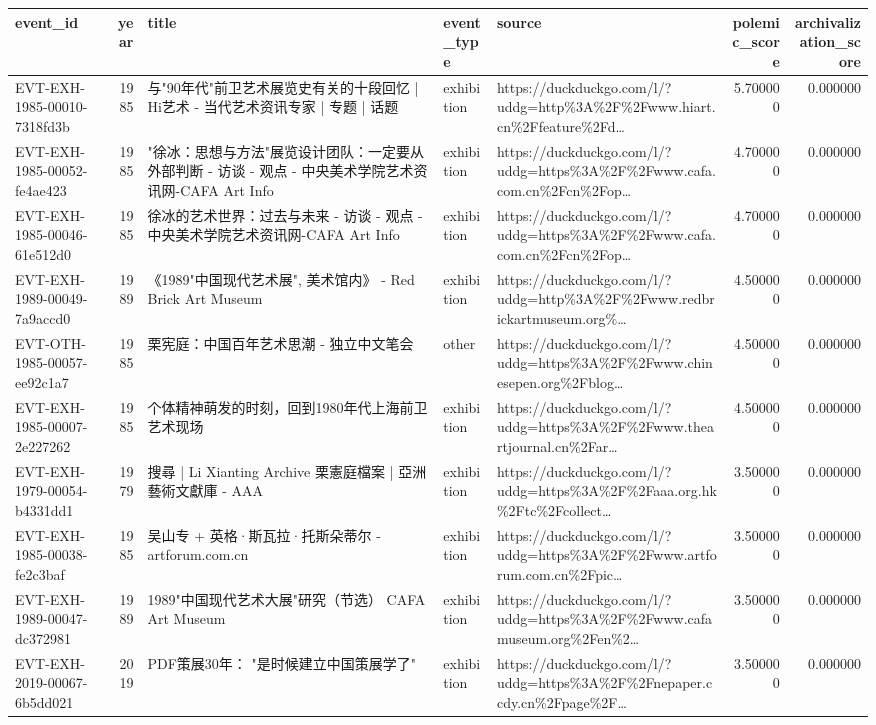 \begin{tabular}{lrlllrr}
\toprule
event\_id & year & title & event\_type & source & polemic\_score & archivalization\_score \\
\midrule
EVT-EXH-1985-00010-7318fd3b & 1985 & 与"90年代"前卫艺术展览史有关的十段回忆 | Hi艺术 - 当代艺术资讯专家 | 专题 | 话题 & exhibition & https://duckduckgo.com/l/?uddg=http\%3A\%2F\%2Fwww.hiart.cn\%2Ffeature\%2Fd… & 5.700000 & 0.000000 \\
EVT-EXH-1985-00052-fe4ae423 & 1985 & "徐冰：思想与方法"展览设计团队：一定要从外部判断 - 访谈 - 观点 - 中央美术学院艺术资讯网-CAFA Art Info & exhibition & https://duckduckgo.com/l/?uddg=https\%3A\%2F\%2Fwww.cafa.com.cn\%2Fcn\%2Fop… & 4.700000 & 0.000000 \\
EVT-EXH-1985-00046-61e512d0 & 1985 & 徐冰的艺术世界：过去与未来 - 访谈 - 观点 - 中央美术学院艺术资讯网-CAFA Art Info & exhibition & https://duckduckgo.com/l/?uddg=https\%3A\%2F\%2Fwww.cafa.com.cn\%2Fcn\%2Fop… & 4.700000 & 0.000000 \\
EVT-EXH-1989-00049-7a9accd0 & 1989 & 《1989"中国现代艺术展", 美术馆内》 - Red Brick Art Museum & exhibition & https://duckduckgo.com/l/?uddg=http\%3A\%2F\%2Fwww.redbrickartmuseum.org\%… & 4.500000 & 0.000000 \\
EVT-OTH-1985-00057-ee92c1a7 & 1985 & 栗宪庭：中国百年艺术思潮 - 独立中文笔会 & other & https://duckduckgo.com/l/?uddg=https\%3A\%2F\%2Fwww.chinesepen.org\%2Fblog… & 4.500000 & 0.000000 \\
EVT-EXH-1985-00007-2e227262 & 1985 & 个体精神萌发的时刻，回到1980年代上海前卫艺术现场 & exhibition & https://duckduckgo.com/l/?uddg=https\%3A\%2F\%2Fwww.theartjournal.cn\%2Far… & 4.500000 & 0.000000 \\
EVT-EXH-1979-00054-b4331dd1 & 1979 & 搜尋 | Li Xianting Archive 栗憲庭檔案 | 亞洲藝術文獻庫 - AAA & exhibition & https://duckduckgo.com/l/?uddg=https\%3A\%2F\%2Faaa.org.hk\%2Ftc\%2Fcollect… & 3.500000 & 0.000000 \\
EVT-EXH-1985-00038-fe2c3baf & 1985 & 吴山专 + 英格·斯瓦拉·托斯朵蒂尔 - artforum.com.cn & exhibition & https://duckduckgo.com/l/?uddg=https\%3A\%2F\%2Fwww.artforum.com.cn\%2Fpic… & 3.500000 & 0.000000 \\
EVT-EXH-1989-00047-dc372981 & 1989 & 1989"中国现代艺术大展"研究（节选） CAFA Art Museum & exhibition & https://duckduckgo.com/l/?uddg=https\%3A\%2F\%2Fwww.cafamuseum.org\%2Fen\%2… & 3.500000 & 0.000000 \\
EVT-EXH-2019-00067-6b5dd021 & 2019 & PDF策展30年： "是时候建立中国策展学了" & exhibition & https://duckduckgo.com/l/?uddg=https\%3A\%2F\%2Fnepaper.ccdy.cn\%2Fpage\%2F… & 3.500000 & 0.000000 \\
\bottomrule
\end{tabular}
